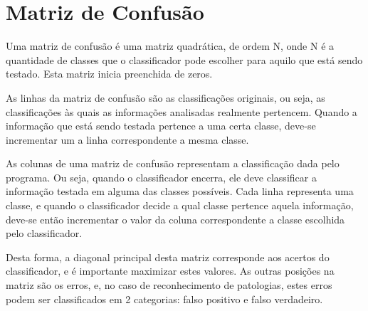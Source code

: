 \documentclass[a4paper,12pt,oneside]{report}
\begin{document}
\section{Matriz de Confus\~{a}o}
\hspace*{+15pt} Uma matriz de confus\~{a}o \'{e} uma matriz quadr\'{a}tica, de ordem N, onde N \'{e} a quantidade de classes que o classificador pode escolher para aquilo que est\'{a} sendo testado. Esta matriz inicia preenchida de zeros.
\\
\par As linhas da matriz de confus\~{a}o s\~{a}o as classifica\c{c}\~{o}es originais, ou seja, as classifica\c{c}\~{o}es \`{a}s quais as informa\c{c}\~{o}es analisadas realmente pertencem. Quando a informa\c{c}\~{a}o que est\'{a} sendo testada pertence a uma certa classe, deve-se incrementar um a linha correspondente a mesma classe. 
\\
\par As colunas de uma matriz de confus\~{a}o representam a classifica\c{c}\~{a}o dada pelo programa. Ou seja, quando o classificador encerra, ele deve classificar a in\-for\-ma\-\c{c}\~{a}o testada em alguma das classes poss\'{i}veis. Cada linha representa uma classe, e quando o classificador decide a qual classe pertence aquela informa\c{c}\~{a}o, deve-se ent\~{a}o incrementar o valor da coluna correspondente a classe escolhida pelo classificador. 
\\
\par Desta forma, a diagonal principal desta matriz corresponde aos acertos do classificador, e \'{e} importante maximizar estes valores. As outras posi\c{c}\~{o}es na matriz s\~{a}o os erros, e, no caso de reconhecimento de patologias, estes erros podem ser classificados em 2 categorias: falso positivo e falso verdadeiro. 
\end{document}
